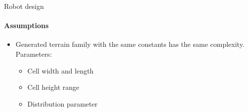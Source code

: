 \documentclass[aspectratio=169,xcolor=table]{beamer}
\begin{document}
\begin{frame}[t]{Robot design}
    \framesubtitle{Assumptions}
    \large
    \begin{itemize}
        \item Generated terrain family with the same constants has the same complexity. 
        \\ 
        Parameters:
              \begin{itemize}
                \large
                  \item Cell width and length
                  \item Cell height range
                  \item Distribution parameter
              \end{itemize}
    \end{itemize}
\end{frame}
\end{document}
